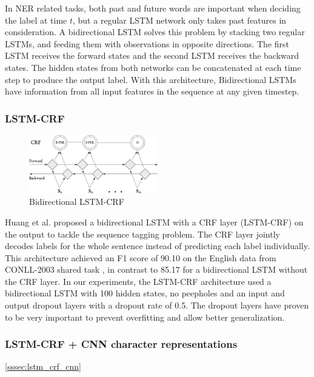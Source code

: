 \documentclass[sigconf]{acmart}
\begin{document}
In NER related tasks, both past and future words are important when deciding the
label at time $ t $, but a regular LSTM network only takes past features in consideration. 
A bidirectional LSTM solves this problem by stacking two regular LSTMs, and feeding
them with observations in opposite directions. The first LSTM receives the forward
states and the second LSTM receives the backward states. The hidden states from both 
networks can be concatenated at each time step to produce the output label. With this 
architecture, Bidirectional LSTMs have information from all input features in the sequence at 
any given timestep.

\subsubsection{LSTM-CRF}
\label{sssec:lstm_crf}

\begin{figure}
  \centering
  \includegraphics[width=0.5\textwidth]{pics/bi_lstm_crf}
  \caption{Bidirectional LSTM-CRF}
  \label{fig:bi_lstm_crf}
\end{figure}

Huang et al. \cite{Huang2015} proposed a bidirectional LSTM with a CRF layer (LSTM-CRF) on the output to tackle
the sequence tagging problem. The CRF layer jointly decodes labels for the whole sentence instead
of predicting each label individually. This architecture achieved an F1 score of 90.10 on the English
data from CONLL-2003 shared task \cite{Sang2003}, in contrast to 85.17 for a bidirectional LSTM without the CRF layer. 
In our experiments, the LSTM-CRF architecture used a bidirectional LSTM with 100 
hidden states, no peepholes and an input and output dropout layers with a dropout
rate of 0.5. The dropout layers have proven to be very important to prevent overfitting 
and allow better generalization.

\subsubsection{LSTM-CRF + CNN character representations}
\ref{sssec:lstm_crf_cnn}
\end{document}
